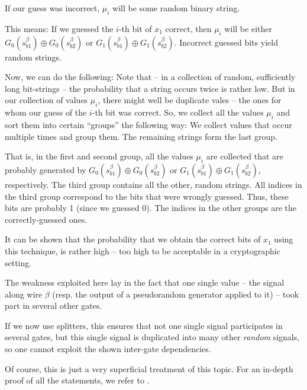 If our guess was incorrect, $\mu_i$ will be some random binary string.

This means: If we guessed the $i$-th bit of $x_1$ correct, then $\mu_i$ will be either $G_0(s^\beta_{b1})\oplus G_0(s^\beta_{b2})$ or $G_1(s^\beta_{b1})\oplus G_1(s^\beta_{b2})$. Incorrect guessed bits yield random strings.

Now, we can do the following: Note that -- in a collection of random, sufficiently long bit-strings -- the probability that a string occurs twice is rather low. But in our collection of values $\mu_i$, there might well be duplicate vales -- the ones for whom our guess of the $i$-th bit was correct. So, we collect all the values $\mu_i$ and sort them into certain ``groups'' the following way: We collect values that occur multiple times and group them. The remaining strings form the last group.

That is, in the first and second group, all the values $\mu_i$ are collected that are probably generated by $G_0(s^\beta_{b1})\oplus G_0(s^\beta_{b2})$ or $G_1(s^\beta_{b1})\oplus G_1(s^\beta_{b2})$, respectively. The third group contains all the other, random strings. All indices in the third group correspond to the bits that were wrongly guessed. Thus, these bits are probably 1 (since we guessed 0). The indices in the other groups are the correctly-guessed ones.

It can be shown that the probability that we obtain the correct bits of $x_1$ using this technique, is rather high -- too high to be acceptable in a cryptographic setting.

The weakness exploited here lay in the fact that one single value -- the signal along wire $\beta$ (resp. the output of a pseudorandom generator applied to it) -- took part in several other gates.

If we now use splitters, this ensures that not one single signal participates in several gates, but this single signal is duplicated into many other \emph{random} signals, so one cannot exploit the shown inter-gate dependencies.

Of course, this is just a very superficial treatment of this topic. For an in-depth proof of all the statements, we refer to \cite{Xu:2004:MAS:1023552}.

